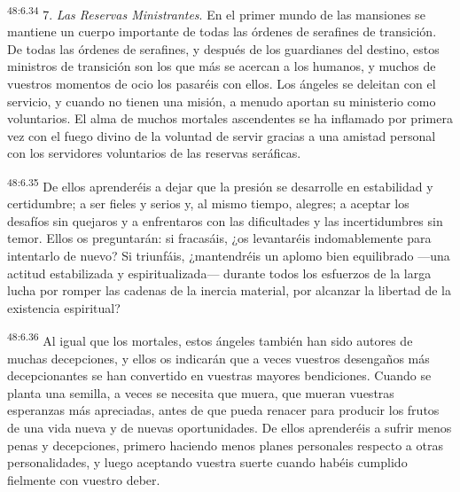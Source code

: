 \par
\textsuperscript{48:6.34} 7. \textit{Las Reservas Ministrantes}. En el primer mundo de las mansiones se mantiene un cuerpo importante de todas las órdenes de serafines de transición. De todas las órdenes de serafines, y después de los guardianes del destino, estos ministros de transición son los que más se acercan a los humanos, y muchos de vuestros momentos de ocio los pasaréis con ellos. Los ángeles se deleitan con el servicio, y cuando no tienen una misión, a menudo aportan su ministerio como voluntarios. El alma de muchos mortales ascendentes se ha inflamado por primera vez con el fuego divino de la voluntad de servir gracias a una amistad personal con los servidores voluntarios de las reservas seráficas.

\par
\textsuperscript{48:6.35} De ellos aprenderéis a dejar que la presión se desarrolle en estabilidad y certidumbre; a ser fieles y serios y, al mismo tiempo, alegres; a aceptar los desafíos sin quejaros y a enfrentaros con las dificultades y las incertidumbres sin temor. Ellos os preguntarán: si fracasáis, ¿os levantaréis indomablemente para intentarlo de nuevo? Si triunfáis, ¿mantendréis un aplomo bien equilibrado ---una actitud estabilizada y espiritualizada--- durante todos los esfuerzos de la larga lucha por romper las cadenas de la inercia material, por alcanzar la libertad de la existencia espiritual?

\par
\textsuperscript{48:6.36} Al igual que los mortales, estos ángeles también han sido autores de muchas decepciones, y ellos os indicarán que a veces vuestros desengaños más decepcionantes se han convertido en vuestras mayores bendiciones. Cuando se planta una semilla, a veces se necesita que muera, que mueran vuestras esperanzas más apreciadas, antes de que pueda renacer para producir los frutos de una vida nueva y de nuevas oportunidades. De ellos aprenderéis a sufrir menos penas y decepciones, primero haciendo menos planes personales respecto a otras personalidades, y luego aceptando vuestra suerte cuando habéis cumplido fielmente con vuestro deber.

